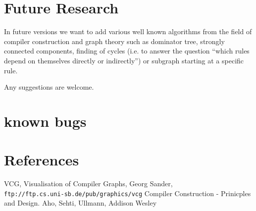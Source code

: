 \documentclass[a4paper,twocolumn]{article}
\begin{document}
\section{Future Research}
In future versions we want to add various well known algorithms from the 
field of compiler construction and graph theory such as dominator tree, 
strongly connected components, finding of cycles (i.e. to answer the question
``which rules depend on themselves directly or indirectly'') or subgraph 
starting at a specific rule.

Any suggestions are welcome.



\appendix

\section{known bugs}


\section{References}
\begin{thebibliography}{99}
VCG, Visualisation of Compiler Graphs, Georg Sander, \\
	{\tt ftp://ftp.cs.uni-sb.de/pub/graphics/vcg}
Compiler Construction - Prinicples and Design. Aho, Sehti,
	Ullmann, Addison Wesley
\end{thebibliography}
\end{document}
